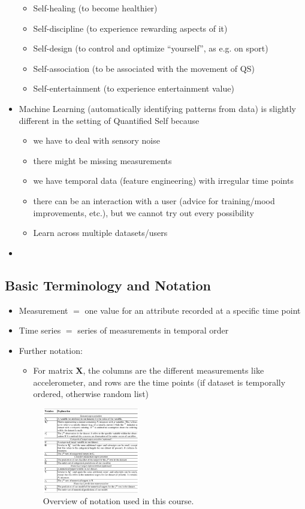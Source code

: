 \begin{itemize}
\begin{itemize}
		\item Self-healing (to become healthier)
		\item Self-discipline (to experience rewarding aspects of it)
		\item Self-design (to control and optimize ``yourself'', as e.g. on sport)
		\item Self-association (to be associated with the movement of QS)
		\item Self-entertainment (to experience entertainment value)
	\end{itemize}
	\item Machine Learning (automatically identifying patterns from data) is slightly different in the setting of Quantified Self because
	\begin{itemize}
		\item we have to deal with sensory noise
		\item there might be missing measurements
		\item we have temporal data (feature engineering) with irregular time points
		\item there can be an interaction with a user (advice for training/mood improvements, etc.), but we cannot try out every possibility
		\item Learn across multiple datasets/users
	\end{itemize}
	\item {}
\end{itemize}
\subsection{Basic Terminology and Notation}
\begin{itemize}
	\item Measurement $=$ one value for an attribute recorded at a specific time point
	\item Time series $=$ series of measurements in temporal order
	\item Further notation: 
	\begin{itemize}
		\item For matrix $\bm{X}$, the columns are the different measurements like accelerometer, and rows are the time points (if dataset is temporally ordered, otherwise random list) 
	\end{itemize}
	\begin{figure}[ht!]
		\centering
		\includegraphics[width=0.4\textwidth]{figures/intro_notation.png}
		\caption{Overview of notation used in this course.}
	\end{figure}
\end{itemize}
